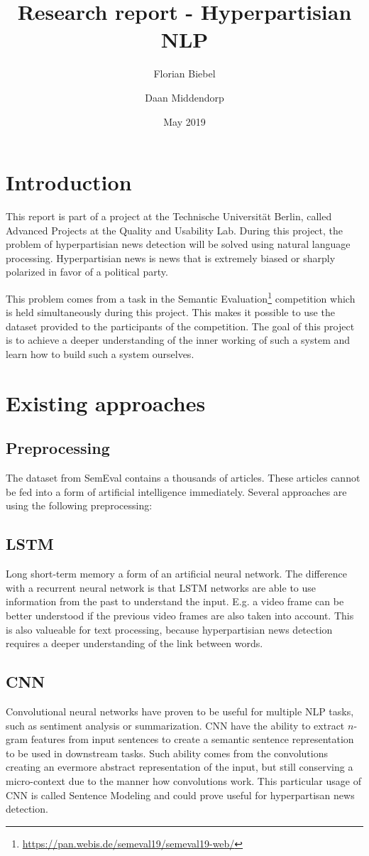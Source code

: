 \documentclass{article}
\title{Research report - Hyperpartisian NLP}
\author{Florian Biebel \and Daan Middendorp}
\date{May 2019}
\begin{document}
\maketitle

\section{Introduction}
This report is part of a project at the Technische Universität Berlin, called Advanced Projects at the Quality and Usability Lab. During this project, the problem of hyperpartisian news detection will be solved using natural language processing. Hyperpartisian news is news that is extremely biased or sharply polarized in favor of a political party.

This problem comes from a task in the Semantic Evaluation\footnote{\url{https://pan.webis.de/semeval19/semeval19-web/}} competition which is held simultaneously during this project. This makes it possible to use the dataset provided to the participants of the competition. The goal of this project is to achieve a deeper understanding of the inner working of such a system and learn how to build such a system ourselves.

\section{Existing approaches}
\subsection{Preprocessing}
The dataset from SemEval contains a thousands of articles. These articles cannot be fed into a form of artificial intelligence immediately. Several approaches are using the following preprocessing:


\subsection{LSTM}
Long short-term memory a form of an artificial neural network. The difference with a recurrent neural network is that LSTM networks are able to use information from the past to understand the input. E.g. a video frame can be better understood if the previous video frames are also taken into account. This is also valueable for text processing, because hyperpartisian news detection requires a deeper understanding of the link between words.
\subsection{CNN}
Convolutional  neural networks have proven to be useful for multiple NLP tasks, such as sentiment analysis or summarization.
CNN have the ability to extract $n$-gram features from input sentences to create a semantic sentence representation to be used in downstream tasks.
Such ability comes from the convolutions creating an evermore abstract representation of the input, but still conserving a micro-context due to the manner how convolutions work.
This particular usage of CNN is called Sentence Modeling and could prove useful for hyperpartisan news detection.
\end{document}
